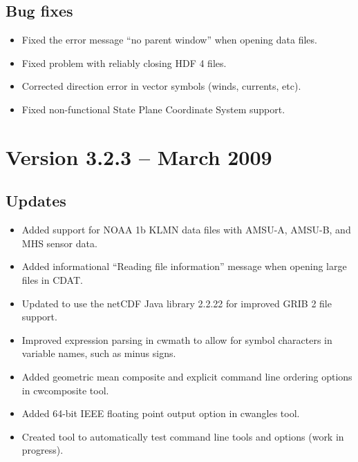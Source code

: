 \subsection*{ Bug fixes}
\begin{itemize}

  \item Fixed the error message ``no parent window'' when opening data files.

  \item Fixed problem with reliably closing HDF 4 files.

  \item Corrected direction error in vector symbols (winds, currents, etc).

  \item Fixed non-functional State Plane Coordinate System support.

\end{itemize}


\section{Version 3.2.3 -- March 2009}

\subsection*{ Updates}

\begin{itemize}

  \item Added support for NOAA 1b KLMN data files with AMSU-A,
    AMSU-B, and MHS sensor data.

  \item Added informational ``Reading file information'' message
    when opening large files in CDAT.

  \item Updated to use the netCDF Java library 2.2.22 for
    improved GRIB 2 file support.

  \item Improved expression parsing in cwmath to allow for symbol
    characters in variable names, such as minus signs.

  \item Added geometric mean composite and explicit command line
    ordering options in cwcomposite tool.

  \item Added 64-bit IEEE floating point output option in
    cwangles tool.

  \item Created tool to automatically test command line tools and
    options (work in progress).

\end{itemize}

